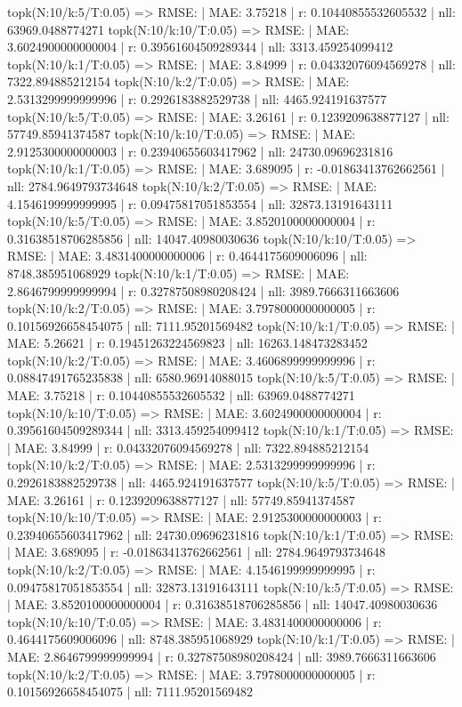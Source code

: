 topk(N:10/k:5/T:0.05) => RMSE: | MAE: 3.75218 | r: 0.10440855532605532 | nll: 63969.0488774271
topk(N:10/k:10/T:0.05) => RMSE: | MAE: 3.6024900000000004 | r: 0.39561604509289344 | nll: 3313.459254099412
topk(N:10/k:1/T:0.05) => RMSE: | MAE: 3.84999 | r: 0.04332076094569278 | nll: 7322.894885212154
topk(N:10/k:2/T:0.05) => RMSE: | MAE: 2.5313299999999996 | r: 0.2926183882529738 | nll: 4465.924191637577
topk(N:10/k:5/T:0.05) => RMSE: | MAE: 3.26161 | r: 0.1239209638877127 | nll: 57749.85941374587
topk(N:10/k:10/T:0.05) => RMSE: | MAE: 2.9125300000000003 | r: 0.23940655603417962 | nll: 24730.09696231816
topk(N:10/k:1/T:0.05) => RMSE: | MAE: 3.689095 | r: -0.01863413762662561 | nll: 2784.9649793734648
topk(N:10/k:2/T:0.05) => RMSE: | MAE: 4.1546199999999995 | r: 0.09475817051853554 | nll: 32873.13191643111
topk(N:10/k:5/T:0.05) => RMSE: | MAE: 3.8520100000000004 | r: 0.31638518706285856 | nll: 14047.40980030636
topk(N:10/k:10/T:0.05) => RMSE: | MAE: 3.4831400000000006 | r: 0.4644175609006096 | nll: 8748.385951068929
topk(N:10/k:1/T:0.05) => RMSE: | MAE: 2.8646799999999994 | r: 0.32787508980208424 | nll: 3989.7666311663606
topk(N:10/k:2/T:0.05) => RMSE: | MAE: 3.7978000000000005 | r: 0.10156926658454075 | nll: 7111.95201569482
topk(N:10/k:1/T:0.05) => RMSE: | MAE: 5.26621 | r: 0.19451263224569823 | nll: 16263.148473283452
topk(N:10/k:2/T:0.05) => RMSE: | MAE: 3.4606899999999996 | r: 0.08847491765235838 | nll: 6580.96914088015
topk(N:10/k:5/T:0.05) => RMSE: | MAE: 3.75218 | r: 0.10440855532605532 | nll: 63969.0488774271
topk(N:10/k:10/T:0.05) => RMSE: | MAE: 3.6024900000000004 | r: 0.39561604509289344 | nll: 3313.459254099412
topk(N:10/k:1/T:0.05) => RMSE: | MAE: 3.84999 | r: 0.04332076094569278 | nll: 7322.894885212154
topk(N:10/k:2/T:0.05) => RMSE: | MAE: 2.5313299999999996 | r: 0.2926183882529738 | nll: 4465.924191637577
topk(N:10/k:5/T:0.05) => RMSE: | MAE: 3.26161 | r: 0.1239209638877127 | nll: 57749.85941374587
topk(N:10/k:10/T:0.05) => RMSE: | MAE: 2.9125300000000003 | r: 0.23940655603417962 | nll: 24730.09696231816
topk(N:10/k:1/T:0.05) => RMSE: | MAE: 3.689095 | r: -0.01863413762662561 | nll: 2784.9649793734648
topk(N:10/k:2/T:0.05) => RMSE: | MAE: 4.1546199999999995 | r: 0.09475817051853554 | nll: 32873.13191643111
topk(N:10/k:5/T:0.05) => RMSE: | MAE: 3.8520100000000004 | r: 0.31638518706285856 | nll: 14047.40980030636
topk(N:10/k:10/T:0.05) => RMSE: | MAE: 3.4831400000000006 | r: 0.4644175609006096 | nll: 8748.385951068929
topk(N:10/k:1/T:0.05) => RMSE: | MAE: 2.8646799999999994 | r: 0.32787508980208424 | nll: 3989.7666311663606
topk(N:10/k:2/T:0.05) => RMSE: | MAE: 3.7978000000000005 | r: 0.10156926658454075 | nll: 7111.95201569482
